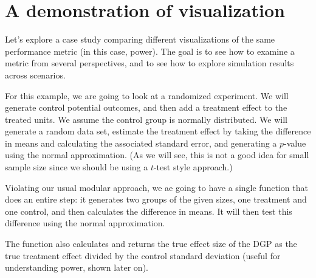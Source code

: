 \documentclass[
]{book}
\begin{document}
\hypertarget{a-demonstration-of-visualization}{%
\section{A demonstration of visualization}\label{a-demonstration-of-visualization}}

Let's explore a case study comparing different visualizations of the same performance metric (in this case, power).
The goal is to see how to examine a metric from several perspectives, and to see how to explore simulation results across scenarios.

For this example, we are going to look at a randomized experiment. We
will generate control potential outcomes, and then add a treatment effect to the treated units.
We assume the control group is normally distributed.
We will generate a random data set, estimate the
treatment effect by taking the difference in means and calculating the
associated standard error, and generating a \(p\)-value using the normal
approximation. (As we will see, this is not a good idea for small sample
size since we should be using a \(t\)-test style approach.)

Violating our usual modular approach, we ae going to have a single function that does an entire step: it generates two groups of the given sizes, one treatment and
one control, and then calculates the difference in means. It will then test
this difference using the normal approximation.

The function also calculates and returns the true effect size of the DGP as the true treatment
effect divided by the control standard deviation (useful for understanding
power, shown later on).
\end{document}
